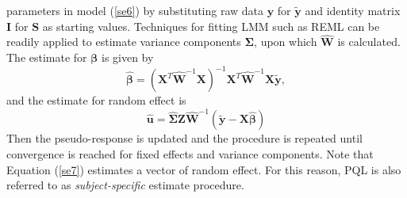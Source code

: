 parameters in model (\ref{se6}) by substituting raw data $\bm y$ for $\tilde{\bm y}$  and identity
matrix $\bm I$ for $\bm S$ as starting values. Techniques for fitting LMM such as REML can be
readily applied to estimate variance components $\bm \Sigma$, upon which $\hat{\bm W}$ is
calculated. The estimate for $\bm \beta$ is given by
\begin{equation}
\hat{\bm\beta} = (\bm X^T\hat{\bm W}^{-1} \bm X)^{-1}\bm X^T\hat{\bm W}^{-1}\bm X \tilde{\bm y},
\end{equation}
and the estimate for random effect is 
\begin{equation}\label{se7}
\hat{\bm u} = \hat{\bm\Sigma } \bm Z \hat{\bm W}^{-1} (\tilde{\bm y}-\bm {X} \hat{\bm \beta})
\end{equation}
Then the pseudo-response is updated and the procedure is repeated until convergence is reached for
fixed effects and variance components.  Note that Equation (\ref{se7}) estimates a vector of random
effect. For this reason, PQL is also referred to as \textit{subject-specific} estimate procedure. 

